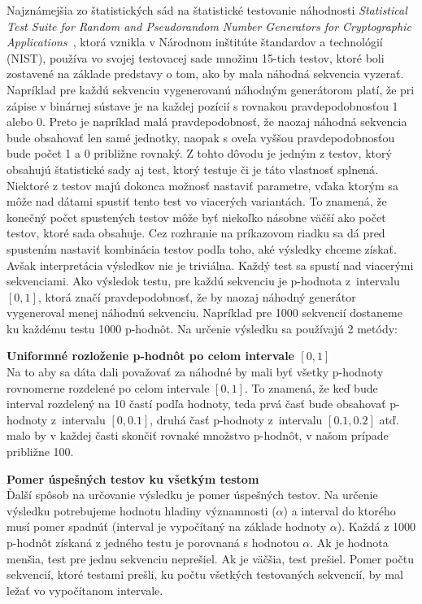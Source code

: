Najznámejšia zo štatistických sád na štatistické testovanie náhodnosti \textit{Statistical Test Suite for Random and Pseudorandom Number Generators for Cryptographic Applications}~\parencite{nist-sts-documentation}, ktorá vznikla v Národnom inštitúte štandardov a technológií (NIST), používa vo svojej testovacej sade množinu 15-tich testov, ktoré boli zostavené na základe predstavy o tom, ako by mala náhodná sekvencia vyzerať. Napríklad pre každú sekvenciu vygenerovanú náhodným generátorom platí, že pri zápise v binárnej sústave je na každej pozícií s rovnakou pravdepodobnosťou 1 alebo 0. Preto je napríklad malá pravdepodobnosť, že naozaj náhodná sekvencia bude obsahovať len samé jednotky, naopak s oveľa vyššou pravdepodobnosťou bude počet 1 a 0 približne rovnaký. Z tohto dôvodu je jedným z testov, ktorý obsahujú štatistické sady aj test, ktorý testuje či je táto vlastnosť splnená. Niektoré z testov majú dokonca možnosť nastaviť parametre, vďaka ktorým sa môže nad dátami spustiť tento test vo viacerých variantách. To znamená, že konečný počet spustených testov môže byť niekoľko násobne väčší ako počet testov, ktoré sada obsahuje. Cez rozhranie na príkazovom riadku sa dá pred spustením nastaviť kombinácia testov podľa toho, aké výsledky chceme získať. Avšak interpretácia výsledkov nie je triviálna. Každý test sa spustí nad viacerými sekvenciami. Ako výsledok testu, pre každú sekvenciu je p-hodnota z~intervalu $[0, 1]$, ktorá značí pravdepodobnosť, že by naozaj náhodný generátor vygeneroval menej náhodnú sekvenciu. Napríklad pre 1000 sekvencií dostaneme ku každému testu 1000 p-hodnôt. Na určenie výsledku sa používajú 2 metódy:
\begin{myItemize}
	\item \textbf{Uniformné rozloženie p-hodnôt po celom intervale $[0, 1]$}\\Na to aby sa dáta dali považovať za náhodné by mali byť všetky p-hodnoty rovnomerne rozdelené po celom intervale $[0, 1]$. To znamená, že keď bude interval rozdelený na 10 častí podľa hodnoty, teda prvá časť bude obsahovať p-hodnoty z~intervalu $[0, 0.1]$, druhá časť p-hodnoty z~intervalu $[0.1, 0.2]$ atď. malo by v každej časti skončiť rovnaké množstvo p-hodnôt, v našom prípade približne 100.
	\item \textbf{Pomer úspešných testov ku všetkým testom}\\Ďalší spôsob na určovanie výsledku je pomer úspešných testov. Na určenie výsledku potrebujeme hodnotu hladiny významnosti ($\alpha$) a interval do ktorého musí pomer spadnúť (interval je vypočítaný na základe hodnoty $\alpha$). Každá z 1000 p-hodnôt získaná z jedného testu je porovnaná s hodnotou $\alpha$. Ak je hodnota menšia, test pre jednu sekvenciu neprešiel. Ak je väčšia, test prešiel. Pomer počtu sekvencií, ktoré testami prešli, ku počtu všetkých testovaných sekvencií, by mal ležať vo vypočítanom intervale.
\end{myItemize}
